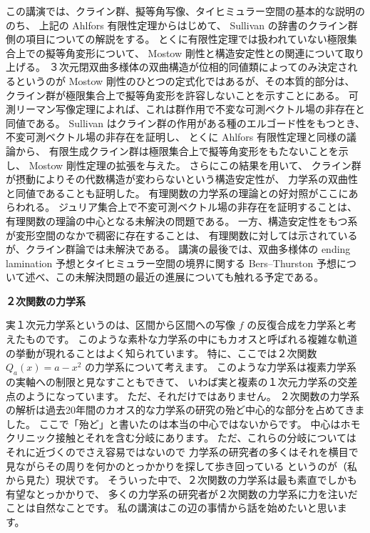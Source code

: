 \documentclass[uplatex,dvipdfmx]{jlreq}
\begin{document}
この講演では、クライン群、擬等角写像、タイヒミュラー空間の基本的な説明ののち、
上記の Ahlfors 有限性定理からはじめて、
Sullivan の辞書のクライン群側の項目についての解説をする。
とくに有限性定理では扱われていない極限集合上での擬等角変形について、
Mostow 剛性と構造安定性との関連について取り上げる。
３次元閉双曲多様体の双曲構造が位相的同値類によってのみ決定されるというのが
Mostow 剛性のひとつの定式化ではあるが、その本質的部分は、
クライン群が極限集合上で擬等角変形を許容しないことを示すことにある。
可測リーマン写像定理によれば、これは群作用で不変な可測ベクトル場の非存在と同値である。
Sullivan はクライン群の作用がある種のエルゴード性をもつとき、
不変可測ベクトル場の非存在を証明し、
とくに Ahlfors 有限性定理と同様の議論から、
有限生成クライン群は極限集合上で擬等角変形をもたないことを示し、
Mostow 剛性定理の拡張を与えた。
さらにこの結果を用いて、
クライン群が摂動によりその代数構造が変わらないという構造安定性が、
力学系の双曲性と同値であることも証明した。
有理関数の力学系の理論との好対照がここにあらわれる。
ジュリア集合上で不変可測ベクトル場の非存在を証明することは、
有理関数の理論の中心となる未解決の問題である。
一方、構造安定性をもつ系が変形空間のなかで稠密に存在することは、
有理関数に対しては示されているが、クライン群論では未解決である。
講演の最後では、双曲多様体の ending lamination 予想とタイヒミュラー空間の境界に関する
Bers--Thurston 予想について述べ、この未解決問題の最近の進展についても触れる予定である。

\newpage

\noindent
{\large\bfseries ２次関数の力学系}

\bigskip
\hspace*{\fill}{\large\bfseries 辻井　正人（北海道大・理）}

\bigskip

実１次元力学系というのは、区間から区間への写像 $f$ の反復合成を力学系と考えたものです。
このような素朴な力学系の中にもカオスと呼ばれる複雑な軌道の挙動が現れることはよく知られています。
特に、ここでは２次関数 $Q_a(x) = a - x^2$ の力学系について考えます。
このような力学系は複素力学系の実軸への制限と見なすこともできて、
いわば実と複素の１次元力学系の交差点のようになっています。
ただ、それだけではありません。
２次関数の力学系の解析は過去20年間のカオス的な力学系の研究の殆ど中心的な部分を占めてきました。
ここで「殆ど」と書いたのは本当の中心ではないからです。
中心はホモクリニック接触とそれを含む分岐にあります。
ただ、これらの分岐についてはそれに近づくのでさえ容易ではないので
力学系の研究者の多くはそれを横目で見ながらその周りを何かのとっかかりを探して歩き回っている
というのが（私から見た）現状です。
そういった中で、２次関数の力学系は最も素直でしかも有望なとっかかりで、
多くの力学系の研究者が２次関数の力学系に力を注いだことは自然なことです。
私の講演はこの辺の事情から話を始めたいと思います。
\end{document}
